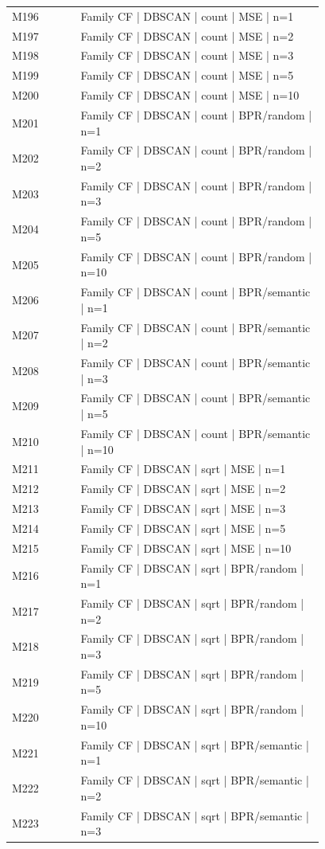 \begin{longtable}{lp{0.78\linewidth}}
M196 & Family CF | DBSCAN | count | MSE | n=1 \\
M197 & Family CF | DBSCAN | count | MSE | n=2 \\
M198 & Family CF | DBSCAN | count | MSE | n=3 \\
M199 & Family CF | DBSCAN | count | MSE | n=5 \\
M200 & Family CF | DBSCAN | count | MSE | n=10 \\
M201 & Family CF | DBSCAN | count | BPR/random | n=1 \\
M202 & Family CF | DBSCAN | count | BPR/random | n=2 \\
M203 & Family CF | DBSCAN | count | BPR/random | n=3 \\
M204 & Family CF | DBSCAN | count | BPR/random | n=5 \\
M205 & Family CF | DBSCAN | count | BPR/random | n=10 \\
M206 & Family CF | DBSCAN | count | BPR/semantic | n=1 \\
M207 & Family CF | DBSCAN | count | BPR/semantic | n=2 \\
M208 & Family CF | DBSCAN | count | BPR/semantic | n=3 \\
M209 & Family CF | DBSCAN | count | BPR/semantic | n=5 \\
M210 & Family CF | DBSCAN | count | BPR/semantic | n=10 \\
M211 & Family CF | DBSCAN | sqrt | MSE | n=1 \\
M212 & Family CF | DBSCAN | sqrt | MSE | n=2 \\
M213 & Family CF | DBSCAN | sqrt | MSE | n=3 \\
M214 & Family CF | DBSCAN | sqrt | MSE | n=5 \\
M215 & Family CF | DBSCAN | sqrt | MSE | n=10 \\
M216 & Family CF | DBSCAN | sqrt | BPR/random | n=1 \\
M217 & Family CF | DBSCAN | sqrt | BPR/random | n=2 \\
M218 & Family CF | DBSCAN | sqrt | BPR/random | n=3 \\
M219 & Family CF | DBSCAN | sqrt | BPR/random | n=5 \\
M220 & Family CF | DBSCAN | sqrt | BPR/random | n=10 \\
M221 & Family CF | DBSCAN | sqrt | BPR/semantic | n=1 \\
M222 & Family CF | DBSCAN | sqrt | BPR/semantic | n=2 \\
M223 & Family CF | DBSCAN | sqrt | BPR/semantic | n=3 \\

\end{longtable}
